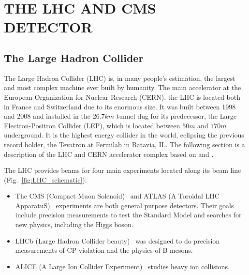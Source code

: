 %
%
%



\chapter{\uppercase {The LHC and CMS Detector}}

\section{The Large Hadron Collider}

The Large Hadron Collider (LHC) \cite{Breskin:1244506} is, in many people's estimation, the largest and most complex machine ever built by humanity. The main accelerator at the European Organization for Nuclear Research (CERN), the LHC is located both in France and Switzerland due to its enormous size. It was built between 1998 and 2008 and installed in the $26.7\unit{km}$ tunnel dug for its predecessor, the Large Electron-Positron Collider (LEP), which is located between $50\unit{m}$ and $170\unit{m}$ underground. It is the highest energy collider in the world, eclipsing the previous record holder, the Tevatron at Fermilab in Batavia, IL. The following section is a description of the LHC and CERN accelerator complex based on \cite{LHCmachine} and \cite{Breskin:1244506}.

The LHC provides beams for four main experiments located along its beam line (Fig.~\ref{fig:LHC_schematic}):
\begin{itemize}
	\item The CMS (Compact Muon Solenoid)~\cite{Chatrchyan:2008aa} and ATLAS (A Toroidal LHC ApparatuS)~\cite{1748-0221-3-08-S08003} experiments are both general purpose detectors. Their goals include precision measurements to test the Standard Model and searches for new physics, including the Higgs boson.
	\item LHCb (Large Hadron Collider beauty)~\cite{Alves:2008zz} was designed to do precision measurements of CP-violation and the physics of B-mesons.
	\item ALICE (A Large Ion Collider Experiment)~\cite{Aamodt:2008zz} studies heavy ion collisions.
\end{itemize}


